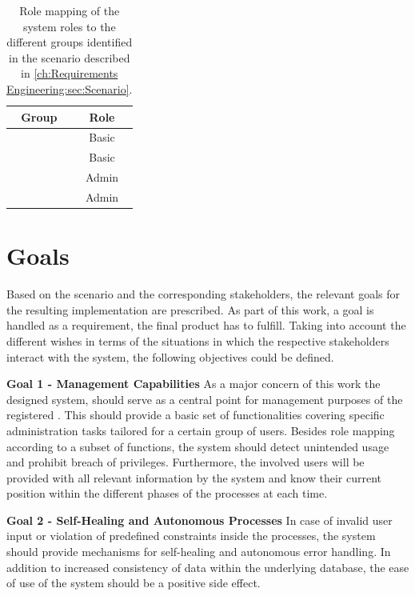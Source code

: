 \begingroup
\setlength{\tabcolsep}{10pt} %
\renewcommand{\arraystretch}{1.5} %
\begin{table}[h]
    \centering
    \caption{Role mapping of the system roles to the different groups identified in the scenario described in \ref{ch:Requirements Engineering:sec:Scenario}.}
    \begin{tabular}{c|c}
        Group & Role \\
        \hline
        \nameref{ch:Requirements Engineering:sec:Stakeholders:ssec:Student} & Basic \\
        \nameref{ch:Requirements Engineering:sec:Stakeholders:ssec:Staff} & Basic \\
        \nameref{ch:Requirements Engineering:sec:Stakeholders:ssec:Staff:sssec:Maintenance Personal} & Admin \\
        \nameref{ch:Requirements Engineering:sec:Stakeholders:ssec:Staff:sssec:Administration} & Admin
    \end{tabular}
    \label{tab:stakeholder-role-mapping}
\end{table}
\endgroup

\section{Goals}
\label{ch:Requirements Engineering:sec:Goals}

Based on the scenario and the corresponding stakeholders, the relevant goals for the resulting implementation are prescribed. As part of this work, a goal is handled as a requirement, the final product has to fulfill. 
Taking into account the different wishes in terms of the situations in which the respective stakeholders interact with the system, the following objectives could be defined.

\noindent \textbf{Goal 1 - Management Capabilities} As a major concern of this work the designed system, should serve as a central point for management purposes of the registered . This should provide a basic set of functionalities covering specific administration tasks tailored for a certain group of users. 
Besides role mapping according to a subset of functions, the system should detect unintended usage and prohibit breach of privileges.
Furthermore, the involved users will be provided with all relevant information by the system and know their current position within the different phases of the processes at each time. 

\noindent \textbf{Goal 2 - Self-Healing and Autonomous Processes} In case of invalid user input or violation of predefined constraints inside the processes, the system should provide mechanisms for self-healing and autonomous error handling. 
In addition to increased consistency of data within the underlying database, the ease of use of the system should be a positive side effect.

